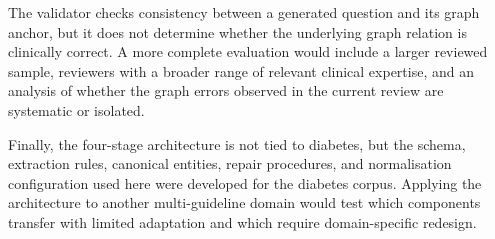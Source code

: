 The validator checks consistency between a generated question and its graph
anchor, but it does not determine whether the underlying graph relation is
clinically correct. A more complete evaluation would include a larger
reviewed sample, reviewers with a broader range of relevant clinical
expertise, and an analysis of whether the graph errors observed in the
current review are systematic or isolated.

Finally, the four-stage architecture is not tied to diabetes, but the
schema, extraction rules, canonical entities, repair procedures, and
normalisation configuration used here were developed for the diabetes
corpus. Applying the architecture to another multi-guideline domain would
test which components transfer with limited adaptation and which require
domain-specific redesign.